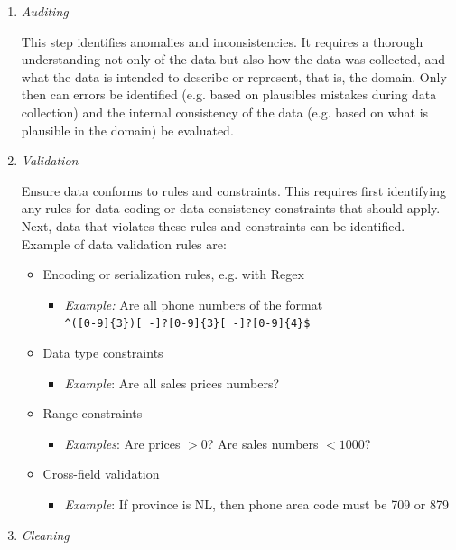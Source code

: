 \begin{enumerate}
\item \emph{Auditing}

This step identifies anomalies and inconsistencies. It requires a thorough understanding not only of the data but also how the data was collected, and what the data is intended to describe or represent, that is, the domain. Only then can errors be identified (e.g. based on plausibles mistakes during data collection) and the internal consistency of the data (e.g. based on what is plausible in the domain) be evaluated. 

\item \emph{Validation}

Ensure data conforms to rules and constraints. This requires first identifying any rules for data coding or data consistency constraints that should apply. Next, data that violates these rules and constraints can be identified. Example of data validation rules are:

\begin{itemize}
 \item Encoding or serialization rules, e.g. with Regex 
 \begin{itemize}
   \item \emph{Example:} Are all phone numbers of the format\\
   \colorbox{code}{\texttt{\footnotesize \Verb_^([0-9]{3})[ -]?[0-9]{3}[ -]?[0-9]{4}$_}}
 \end{itemize}
 \item Data type constraints
 \begin{itemize}
   \item \emph{Example}: Are all sales prices numbers?
 \end{itemize}
 \item Range constraints
 \begin{itemize}
   \item \emph{Examples}: Are prices $> 0$? Are sales numbers $< 1000$?
 \end{itemize}
 \item Cross-field validation
 \begin{itemize}
   \item \emph{Example}: If province is NL, then phone area code must be 709 or 879
 \end{itemize}
\end{itemize}

\item \emph{Cleaning} 


\end{enumerate}
